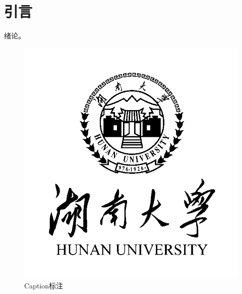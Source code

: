 \chapter{引\quad 言}

绪论。

\begin{figure}
    \centering    \includegraphics{figures/hnu-logo.png}
    \caption{Caption标注}
    \label{fig:1}
\end{figure}

